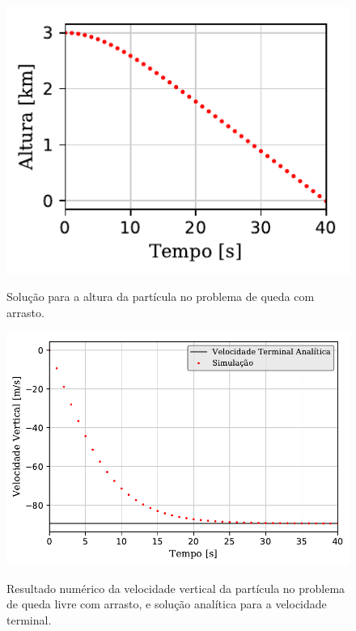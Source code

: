 \begin{figure}[h]
	\caption{Solução para a altura da partícula no problema de queda com arrasto.}
	\centering
	\includegraphics[scale=1]{images/falling_with_drag/y_position_small.pdf}
	\label{fig:falling_with_drag:height}
	\sourceMe
\end{figure}

\begin{figure}[htb!]
	\caption{Resultado numérico da velocidade vertical da partícula no problema de queda livre com arrasto, e solução analítica para a velocidade terminal.}
	\centering
	\includegraphics[scale=1]{images/falling_with_drag/y_velocity_normal.pdf}
	\label{fig:falling_with_drag:speed}
	\sourceMe
\end{figure}

